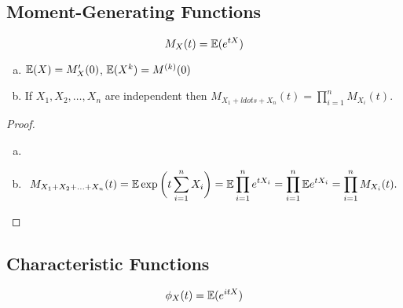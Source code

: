 \subsection{Moment-Generating Functions}

\begin{definition}

\[
M_X(t) = \mathbb{E}(e^{tX}) 
\]

\end{definition}

\begin{theorem}\label{prob.mgf.props.thm}

\begin{enumerate}[(a)]

\item \(\mathbb{E}(X) = M_X'(0)\), \(\mathbb{E}(X^k) = M^{(k)}(0)\)

\item If \(X_1, X_2, \ldots, X_n\) are independent then \(M_{X_1 + ldots + X_n}(t) =\prod_{i=1}^n M_{X_i}(t)\).

\end{enumerate}
\end{theorem}

\begin{proof}

\begin{enumerate}[(a)]

\item

\item 

\[
M_{X_1 + X_2 + \ldots + X_n}(t)  = \mathbb{E} \exp \bigg(t \sum_{i=1}^n X_i \bigg) =  \mathbb{E} \prod_{i=1}^n e^{tX_i} =\prod_{i=1}^n   \mathbb{E} e^{tX_i} = \prod_{i=1}^n M_{X_i}(t).
\]

\end{enumerate}
\end{proof}

\subsection{Characteristic Functions}

\begin{definition}

\[
\phi_X(t) = \mathbb{E}(e^{itX}) 
\]

\end{definition}

